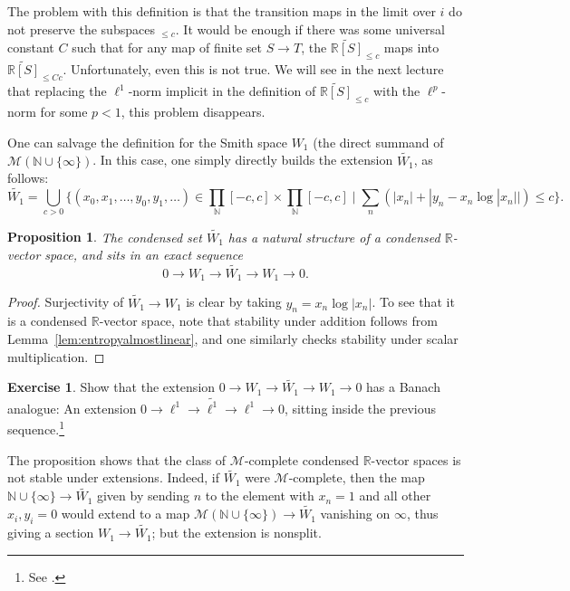 \documentclass[11pt]{amsbook}
\numberwithin{equation}{section}
\numberwithin{theorem}{section}
\newtheorem{proposition}[theorem]{Proposition}
\theoremstyle{definition}
\newtheorem{exercise}[theorem]{Exercise}
\begin{document}
The problem with this definition is that the transition maps in the limit over $i$ do not preserve the subspaces $_{\leq c}$. It would be enough if there was some universal constant $C$ such that for any map of finite set $S\to T$, the $\widetilde{\mathbb R[S]}_{\leq c}$ maps into $\widetilde{\mathbb R[S]}_{\leq C c}$. Unfortunately, even this is not true. We will see in the next lecture that replacing the $\ell^1$-norm implicit in the definition of $\widetilde{\mathbb R[S]}_{\leq c}$ with the $\ell^p$-norm for some $p<1$, this problem disappears.

One can salvage the definition for the Smith space $W_1$ (the direct summand of $\mathcal M(\mathbb N\cup \{\infty\})$. In this case, one simply directly builds the extension $\widetilde{W_1}$, as follows:
\[
\widetilde{W_1} = \bigcup_{c>0} \{(x_0,x_1,\ldots,y_0,y_1,\ldots)\in \prod_{\mathbb N} [-c,c]\times \prod_{\mathbb N} [-c,c]\mid \sum_n(|x_n|+|y_n-x_n\log|x_n||)\leq c\}.
\]

\begin{proposition} The condensed set $\widetilde{W_1}$ has a natural structure of a condensed $\mathbb R$-vector space, and sits in an exact sequence
\[
0\to W_1\to \widetilde{W_1}\to W_1\to 0.
\]
\end{proposition}

\begin{proof} Surjectivity of $\widetilde{W_1}\to W_1$ is clear by taking $y_n=x_n\log|x_n|$. To see that it is a condensed $\mathbb R$-vector space, note that stability under addition follows from Lemma~\ref{lem:entropyalmostlinear}, and one similarly checks stability under scalar multiplication.
\end{proof}

\begin{exercise} Show that the extension $0\to W_1\to \widetilde{W_1}\to W_1\to 0$ has a Banach analogue: An extension $0\to \ell^1\to \widetilde{\ell^1}\to \ell^1\to 0$, sitting inside the previous sequence.\footnote{See \cite{KaltonPeck}.}
\end{exercise}

The proposition shows that the class of $\mathcal M$-complete condensed $\mathbb R$-vector spaces is not stable under extensions. Indeed, if $\widetilde{W_1}$ were $\mathcal M$-complete, then the map $\mathbb N\cup\{\infty\}\to \widetilde{W_1}$ given by sending $n$ to the element with $x_n=1$ and all other $x_i,y_i=0$ would extend to a map $\mathcal M(\mathbb N\cup\{\infty\})\to \widetilde{W_1}$ vanishing on $\infty$, thus giving a section $W_1\to \widetilde{W_1}$; but the extension is nonsplit.
\end{document}
